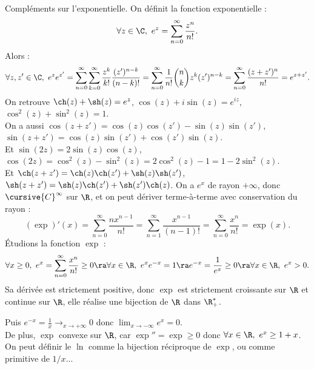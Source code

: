 \documentclass[11pt]{article}
\begin{document}
\begin{ex}{Compléments sur l'exponentielle.}{}
    On définit la fonction exponentielle :
    \begin{equation*}
        \forall z \in \C, ~ e^z = \sum_{n=0}^\infty\frac{z^n}{n!}.
    \end{equation*}   
    Alors :
    \begin{equation*}
        \forall z,z' \in \C, ~ e^{z}e^{z'}=\sum_{n=0}^\infty\sum_{k=0}^{\infty}\frac{z^k}{k!}\frac{(z')^{n-k}}{(n-k)!}=\sum_{n=0}^\infty\frac{1}{n!}\binom{n}{k}z^k(z')^{n-k}=\sum_{n=0}^{\infty}\frac{(z+z')^n}{n!}=e^{z+z'}.
    \end{equation*} 
    On retrouve $\ch(z)+\sh(z)=e^z$, $\cos(z)+i\sin(z)=e^{iz}$, $\cos^2(z)+\sin^2(z)=1$.\\
    On a aussi $\cos(z+z')=\cos(z)\cos(z')-\sin(z)\sin(z')$, $\sin(z+z')=\cos(z)\sin(z')+\cos(z')\sin(z)$.\\
    Et $\sin(2z)=2\sin(z)\cos(z)$, $\cos(2z)=\cos^2(z)-\sin^2(z)=2\cos^2(z)-1=1-2\sin^2(z)$.\\
    Et $\ch(z+z')=\ch(z)\ch(z')+\sh(z)\sh(z')$, $\sh(z+z')=\sh(z)\ch(z')+\sh(z')\ch(z)$.\n
    On a $e^x$ de rayon $+\infty$, donc $\cursive{C}^\infty$ sur $\R$, et on peut dériver terme-à-terme avec conservation du rayon :
    \begin{equation*}
        (\exp)'(x) = \sum_{n=0}^\infty\frac{nx^{n-1}}{n!} = \sum_{n=1}^\infty\frac{x^{n-1}}{(n-1)!}=\sum_{n=0}^\infty\frac{x^n}{n!}=\exp(x).
    \end{equation*}
    Étudions la fonction $\exp$ :
    \begin{equation*}
        \forall x \geq 0, ~ e^x = \sum_{n=0}^\infty \frac{x^n}{n!} \geq 0 \ra \forall x \in \R, ~ e^xe^{-x}=1 \ra e^{-x}=\frac{1}{e^x}\geq0 \ra \forall x \in \R, ~ e^x>0. 
    \end{equation*}
    Sa dérivée est strictement positive, donc $\exp$ est strictement croissante sur $\R$ et continue sur $\R$, elle réalise une bijection de $\R$ dans $\R^*_+$.
    \begin{center}
    \end{center}
    Puis $e^{-x}=\frac{1}{x}\to_{x\to+\infty} 0$ donc $\lim_{x\to-\infty}e^x=0$.\\
    De plus, $\exp$ convexe sur $\R$, car $\exp''=\exp\geq0$ donc $\forall x \in \R, ~ e^x\geq 1+x$.\\
    On peut définir le $\ln$ comme la bijection réciproque de $\exp$, ou comme primitive de $1/x$...
\end{ex}
\end{document}
